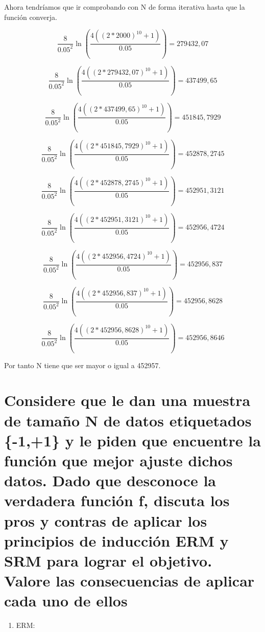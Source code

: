 \documentclass[titlepage]{article}
\begin{document}
  	Ahora tendríamos que ir comprobando con N de forma iterativa hasta que la función converja.
  	
  	$$
  	\frac{8}{0.05^{2}} \ln \left(\frac{4\left((2*2000)^{10} +1\right)}{0.05}\right)
= 279432,07
  	$$
  	
  	$$
  	\frac{8}{0.05^{2}} \ln \left(\frac{4\left((2*279432,07)^{10} +1\right)}{0.05}\right)
= 437499,65
  	$$
  	
  	$$
  	\frac{8}{0.05^{2}} \ln \left(\frac{4\left((2*437499,65)^{10} +1\right)}{0.05}\right)
= 451845,7929
  	$$
  	
  	$$
  	\frac{8}{0.05^{2}} \ln \left(\frac{4\left((2*451845,7929)^{10} +1\right)}{0.05}\right)
= 452878,2745
  	$$
  	
  	$$
  	\frac{8}{0.05^{2}} \ln \left(\frac{4\left((2*452878,2745)^{10} +1\right)}{0.05}\right)
= 452951,3121
  	$$
  	
  	$$
  	\frac{8}{0.05^{2}} \ln \left(\frac{4\left((2*452951,3121)^{10} +1\right)}{0.05}\right)
= 452956,4724
  	$$
  	
  	$$
  	\frac{8}{0.05^{2}} \ln \left(\frac{4\left((2*452956,4724)^{10} +1\right)}{0.05}\right)
= 452956,837
  	$$
  	
  	$$
  	\frac{8}{0.05^{2}} \ln \left(\frac{4\left((2*452956,837)^{10} +1\right)}{0.05}\right)
= 452956,8628
  	$$
  	
  	$$
  	\frac{8}{0.05^{2}} \ln \left(\frac{4\left((2*452956,8628)^{10} +1\right)}{0.05}\right)
= 452956,8646
  	$$
  	
  	Por tanto N tiene que ser mayor o igual a 452957.
  	
  	\section{Considere que le dan una muestra de tamaño N de datos etiquetados \{-1,+1\} y le piden que encuentre la función que mejor ajuste dichos datos. Dado que desconoce la verdadera función f, discuta los pros y contras de aplicar los principios de inducción ERM y SRM para lograr el objetivo. Valore las consecuencias de aplicar cada uno de ellos}
  	
  	\begin{enumerate}
  		\item ERM: 
  	\end{enumerate}
  	
  	 
  	
  	
\end{document}
